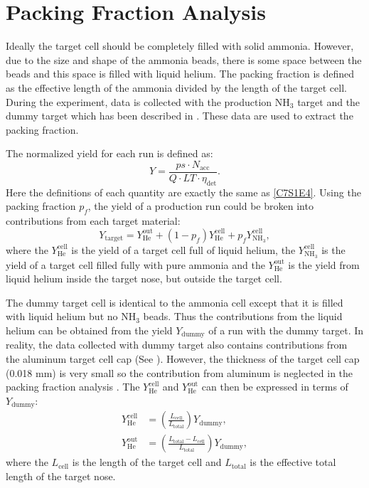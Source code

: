 \section{Packing Fraction Analysis}
\label{C7S3}

Ideally the target cell should be completely filled with solid ammonia. However, due to the size and shape of the ammonia beads, there is some space between the beads and this space is filled with liquid helium. The packing fraction is defined as the effective length of the ammonia divided by the length of the target cell. During the experiment, data is collected with the production NH${}_3$ target and the dummy target which has been described in . These data are used to extract the packing fraction.

The normalized yield for each run is defined as:
\begin{equation} \label{C7S3E1}
Y = \frac{ps\cdot N_{\mathrm{acc}}}{Q\cdot LT\cdot \eta_{\mathrm{det}}}.
\end{equation}
Here the definitions of each quantity are exactly the same as \cref{C7S1E4}. Using the packing fraction $p_f$, the yield of a production run could be broken into contributions from each target material:
\begin{equation} \label{C7S3E2}
Y_{\mathrm{target}} = Y_{\mathrm{He}}^{\mathrm{out}}+(1-p_f)Y_{\mathrm{He}}^{\mathrm{cell}}+p_fY_{\mathrm{NH_{3}}}^{\mathrm{cell}},
\end{equation}
where the $Y_{\mathrm{He}}^{\mathrm{cell}}$ is the yield of a target cell full of liquid helium, the $Y_{\mathrm{NH_3}}^{\mathrm{cell}}$ is the yield of a target cell filled fully with pure ammonia and the $Y_{\mathrm{He}}^{\mathrm{out}}$ is the yield from liquid helium inside the target nose, but outside the target cell.

The dummy target cell is identical to the ammonia cell except that it is filled with liquid helium but no NH${}_3$ beads. Thus the contributions from the liquid helium can be obtained from the yield $Y_{\mathrm{dummy}}$ of a run with the dummy target. In reality, the data collected with dummy target also contains contributions from the aluminum target cell cap (See ). However, the thickness of the target cell cap (0.018 mm) is very small so the contribution from aluminum is neglected in the packing fraction analysis \cite{Cummings2015}. The $Y_{\mathrm{He}}^{\mathrm{cell}}$ and $Y_{\mathrm{He}}^{\mathrm{out}}$ can then be expressed in terms of $Y_{\mathrm{dummy}}$:
\begin{align} \label{C7S3E3}
Y_{\mathrm{He}}^{\mathrm{cell}} & = \left(\frac{L_{\mathrm{cell}}}{L_{\mathrm{total}}}\right)Y_{\mathrm{dummy}}, \\ \label{C7S3E4}
Y_{\mathrm{He}}^{\mathrm{out}} & = \left(\frac{L_{\mathrm{total}}-L_{\mathrm{cell}}}{L_{\mathrm{total}}}\right)Y_{\mathrm{dummy}},
\end{align}
where the $L_{\mathrm{cell}}$ is the length of the target cell and $L_{\mathrm{total}}$ is the effective total length of the target nose.

